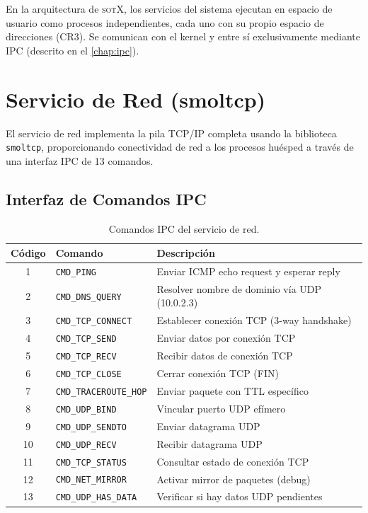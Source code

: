 \documentclass[11pt,twoside,openright]{book}
\theoremstyle{definition}
\theoremstyle{plain}
\theoremstyle{remark}
\newcommand{\sotos}{\textsc{sotX}}
\begin{document}
En la arquitectura de \sotos{}, los servicios del sistema ejecutan en espacio
de usuario como procesos independientes, cada uno con su propio espacio de
direcciones (CR3). Se comunican con el kernel y entre sí exclusivamente
mediante IPC (descrito en el \cref{chap:ipc}).

\section{Servicio de Red (smoltcp)}
\label{sec:net-service}

El servicio de red implementa la pila TCP/IP completa usando la biblioteca
\texttt{smoltcp}, proporcionando conectividad de red a los procesos huésped
a través de una interfaz IPC de 13 comandos.

\subsection{Interfaz de Comandos IPC}

\begin{table}[ht]
\centering
\caption{Comandos IPC del servicio de red.}
\label{tab:net-commands}
\begin{tabular}{@{}clp{7.5cm}@{}}
\toprule
\textbf{Código} & \textbf{Comando} & \textbf{Descripción} \\
\midrule
1  & \texttt{CMD\_PING}          & Enviar ICMP echo request y esperar reply \\
2  & \texttt{CMD\_DNS\_QUERY}    & Resolver nombre de dominio vía UDP (10.0.2.3) \\
3  & \texttt{CMD\_TCP\_CONNECT}  & Establecer conexión TCP (3-way handshake) \\
4  & \texttt{CMD\_TCP\_SEND}     & Enviar datos por conexión TCP \\
5  & \texttt{CMD\_TCP\_RECV}     & Recibir datos de conexión TCP \\
6  & \texttt{CMD\_TCP\_CLOSE}    & Cerrar conexión TCP (FIN) \\
7  & \texttt{CMD\_TRACEROUTE\_HOP} & Enviar paquete con TTL específico \\
8  & \texttt{CMD\_UDP\_BIND}     & Vincular puerto UDP efímero \\
9  & \texttt{CMD\_UDP\_SENDTO}   & Enviar datagrama UDP \\
10 & \texttt{CMD\_UDP\_RECV}     & Recibir datagrama UDP \\
11 & \texttt{CMD\_TCP\_STATUS}   & Consultar estado de conexión TCP \\
12 & \texttt{CMD\_NET\_MIRROR}   & Activar mirror de paquetes (debug) \\
13 & \texttt{CMD\_UDP\_HAS\_DATA} & Verificar si hay datos UDP pendientes \\
\bottomrule
\end{tabular}
\end{table}
\end{document}
